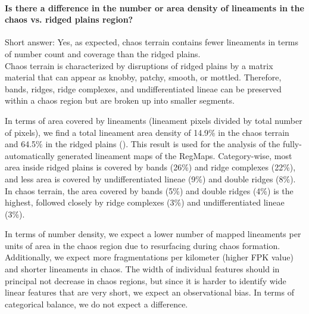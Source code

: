 \paragraph{\textbf{Is there a difference in the number or area density of lineaments in the chaos vs. ridged plains region?}}\label{sec:Q1_numberdensity}
Short answer: Yes, as expected, chaos terrain contains fewer lineaments in terms of number count and coverage than the ridged plains.\\
Chaos terrain is characterized by disruptions of ridged plains by a matrix material that can appear as knobby, patchy, smooth, or mottled. Therefore, bands, ridges, ridge complexes, and undifferentiated lineae can be preserved within a chaos region but are broken up into smaller segments. %

In terms of area covered by lineaments (lineament pixels divided by total number of pixels), we find a total lineament area density of 14.9\% in the chaos terrain and 64.5\% in the ridged plains (). This result is used for the analysis of the fully-automatically generated lineament maps of the RegMaps. Category-wise, most area inside ridged plains is covered by bands (26\%) and ridge complexes (22\%), and less area is covered by undifferentiated lineae (9\%) and double ridges (8\%). In chaos terrain, the area covered by bands (5\%) and double ridges (4\%) is the highest, followed closely by ridge complexes (3\%) and undifferentiated lineae (3\%). 

In terms of number density, we expect a lower number of mapped lineaments per units of area in the chaos region due to resurfacing during chaos formation. Additionally, we expect more fragmentations per kilometer (higher FPK value) and shorter lineaments in chaos. The width of individual features should in principal not decrease in chaos regions, but since it is harder to identify wide linear features that are very short, we expect an observational bias. In terms of categorical balance, we do not expect a difference.


